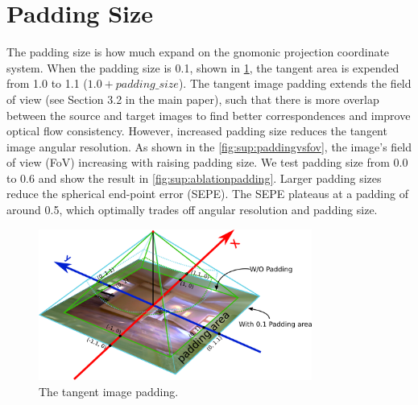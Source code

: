 
















\section{Padding Size}
\label{sec:sup:ablations}

The padding size is how much expand on the gnomonic projection coordinate system.
When the padding size is 0.1, shown in \cref{fig:sup:howtopadding}, the tangent area is expended from 1.0 to 1.1 ($1.0  + padding\_size$).
The tangent image padding extends the field of view  (see Section 3.2 in the main paper), such that there is more overlap between the source and target images to find better correspondences and improve optical flow consistency.
However, increased padding size reduces the tangent image angular resolution. 
As shown in the \cref{fig:sup:paddingvsfov}, the image's field of view (FoV) increasing with raising padding size.
We test padding size from 0.0 to 0.6 and show the result in \cref{fig:sup:ablationpadding}.
Larger padding sizes reduce the spherical end-point error (SEPE).
The SEPE plateaus at a padding of around 0.5, which optimally trades off angular resolution and padding size.


\begin{figure}[hbt!]
	\centering
	\includegraphics[width=0.80\textwidth]{images/tangent_image/tangent_image_padding.pdf}
	\caption{\label{fig:sup:howtopadding}%
		The tangent image padding.}
\end{figure}

